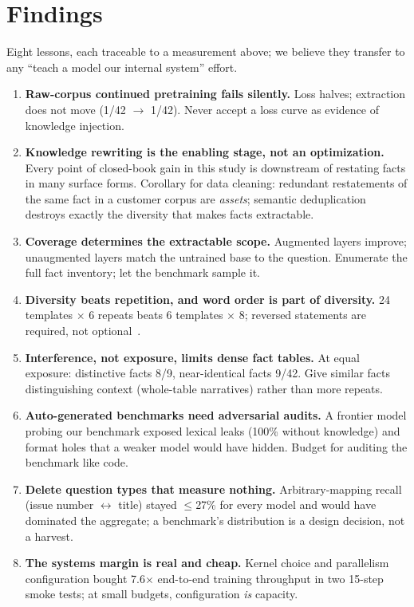 \section{Findings}
\label{sec:findings}

Eight lessons, each traceable to a measurement above; we believe they transfer
to any ``teach a model our internal system'' effort.

\begin{enumerate}
  \item \textbf{Raw-corpus continued pretraining fails silently.} Loss halves;
  extraction does not move (1/42 $\rightarrow$ 1/42). Never accept a loss
  curve as evidence of knowledge injection.
  \item \textbf{Knowledge rewriting is the enabling stage, not an
  optimization.} Every point of closed-book gain in this study is downstream
  of restating facts in many surface forms. Corollary for data cleaning:
  redundant restatements of the same fact in a customer corpus are
  \emph{assets}; semantic deduplication destroys exactly the diversity that
  makes facts extractable.
  \item \textbf{Coverage determines the extractable scope.} Augmented layers
  improve; unaugmented layers match the untrained base to the question.
  Enumerate the full fact inventory; let the benchmark sample it.
  \item \textbf{Diversity beats repetition, and word order is part of
  diversity.} 24 templates $\times$ 6 repeats beats 6 templates $\times$ 8;
  reversed statements are required, not optional~\citep{berglund2023reversal}.
  \item \textbf{Interference, not exposure, limits dense fact tables.} At
  equal exposure: distinctive facts 8/9, near-identical facts 9/42. Give
  similar facts distinguishing context (whole-table narratives) rather than
  more repeats.
  \item \textbf{Auto-generated benchmarks need adversarial audits.} A frontier
  model probing our benchmark exposed lexical leaks (100\% without knowledge)
  and format holes that a weaker model would have hidden. Budget for auditing
  the benchmark like code.
  \item \textbf{Delete question types that measure nothing.} Arbitrary-mapping
  recall (issue number $\leftrightarrow$ title) stayed $\le$27\% for every
  model and would have dominated the aggregate; a benchmark's distribution is
  a design decision, not a harvest.
  \item \textbf{The systems margin is real and cheap.} Kernel choice and
  parallelism configuration bought 7.6$\times$ end-to-end training throughput
  in two 15-step smoke tests; at small budgets, configuration \emph{is}
  capacity.
\end{enumerate}
